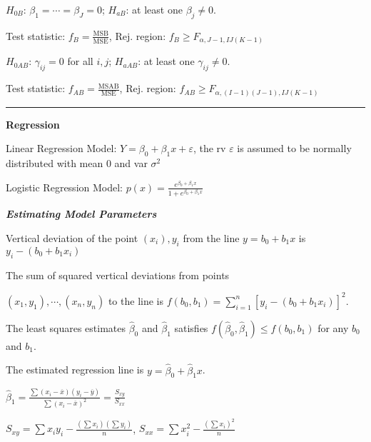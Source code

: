 \documentclass{article}
\newcommand{\sectionline}{\color{black}\rule[2pt]{0.45\textwidth}{0.05em}\color{black}}
\newcommand{\bigtitle}[1]{
	\noindent
	\textbf{#1}
}
\newcommand{\smalltitle}[1]{
	\noindent
	\textbf{\textit{#1}}
}
\begin{document}
	$H_{0B}$: $\beta_1 = \cdots = \beta_J = 0$; $H_{aB}$: at least one $\beta_j \neq 0$.
	
	\noindent
	Test statistic: $f_B = \frac{\mathrm{MSB}}{\mathrm{ MSE }}$, Rej. region: $f_B \geq F_{\alpha,J-1,IJ(K-1)}$
	
	$H_{0AB}$: $\gamma_{ij} = 0$ for all $i,j$; $H_{aAB}$: at least one $\gamma_{ij} \neq 0$.
	
	\noindent
	Test statistic: $f_{AB}  = \frac{\mathrm{MSAB}}{\mathrm{MSE}}$, {\small Rej. region: $f _ { AB } \geq F _ { \alpha , (I - 1)(J-1) , I J ( K - 1 ) }$}
	
	
	\sectionline
	
	\bigtitle{Regression}
	
	Linear Regression Model: $Y = \beta _ { 0 } + \beta _ { 1 } x + \varepsilon$, the rv $\varepsilon$ is assumed to be normally distributed with mean 0 and var $\sigma^2$
	
	Logistic Regression Model: $p ( x ) = \frac { e ^ { \beta _ { 0 } + \beta _ { 1 } x } } { 1 + e ^ { \beta _ { 0 } + \beta _ { 1 } x } }$
	
	\smalltitle{Estimating Model Parameters}
	
	Vertical deviation of the point $(x_i),y_i$ from the line $y = b _ { 0 } + b _ { 1 } x$ is $y _ { i } - \left( b _ { 0 } + b _ { 1 } x _ { i } \right)$
	
	The sum of squared vertical deviations from points
	
	{\small 
		\noindent
		$(x_1,y_1),\cdots,(x_n,y_n)$ to the line is $f \left( b _ { 0 } , b _ { 1 } \right) = \sum _ { i = 1 } ^ { n } \left[ y _ { i } - \left( b _ { 0 } + b _ { 1 } x _ { i } \right) \right] ^ { 2 }$.
	}
	
	The least squares estimates $\hat{ \beta }_0$ and $\hat{ \beta }_1$ satisfies $f \left( \hat { \beta } _ { 0 } , \hat { \beta } _ { 1 } \right) \leq f \left( b _ { 0 } , b _ { 1 } \right)$ for any $b_0$ and $b_1$.
	
	The estimated regression line is $y = \hat { \beta } _ { 0 } + \hat { \beta } _ { 1 } x$.
	
	$\hat { \beta } _ { 1 } = \frac { \sum \left( x _ { i } - \overline { x } \right) \left( y _ { i } - \overline { y } \right) } { \sum \left( x _ { i } - \overline { x } \right) ^ { 2 } } = \frac { S _ { x y } } { S _ { x x } }$
	
	$S _ { x y } = \sum x _ { i } y _ { i } - \frac { \left( \sum x _ { i } \right) \left( \sum y _ { i } \right) } { n }$, $S _ { x x } = \sum x _ { i } ^ { 2 } - \frac { \left( \sum x _ { i } \right) ^ { 2 } } { n }$
	
\end{document}
